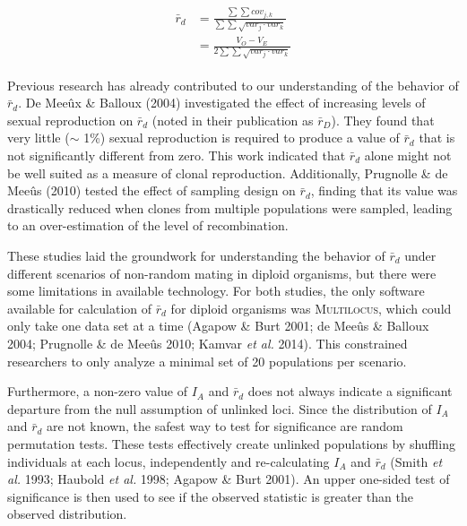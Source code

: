 \documentclass[]{article}
\theoremstyle{definition}
\theoremstyle{definition}
\theoremstyle{remark}
\begin{document}
\begin{align} %
\begin{split} %
\bar{r}_d &= \frac{\sum\sum{cov_{j,k}}}{
                   \sum\sum{\sqrt{var_{j} \cdot var_{k}}}} \\
          &= \frac{V_O - V_E}{2\sum\sum{\sqrt{var_{j} \cdot var_{k}}}}
\end{split}
\label{eq:rd}
\end{align}

Previous research has already contributed to our understanding of the
behavior of \(\bar{r}_d\). De Meeûx \& Balloux (2004) investigated the
effect of increasing levels of sexual reproduction on \(\bar{r}_d\)
(noted in their publication as \(\bar{r}_D\)). They found that very
little (\(\sim\) 1\%) sexual reproduction is required to produce a value
of \(\bar{r}_d\) that is not significantly different from zero. This
work indicated that \(\bar{r}_d\) alone might not be well suited as a
measure of clonal reproduction. Additionally, Prugnolle \& de Meeûs
(2010) tested the effect of sampling design on \(\bar{r}_d\), finding
that its value was drastically reduced when clones from multiple
populations were sampled, leading to an over-estimation of the level of
recombination.

These studies laid the groundwork for understanding the behavior of
\(\bar{r}_d\) under different scenarios of non-random mating in diploid
organisms, but there were some limitations in available technology. For
both studies, the only software available for calculation of
\(\bar{r}_d\) for diploid organisms was \textsc{Multilocus}, which could
only take one data set at a time (Agapow \& Burt 2001; de Meeûs \&
Balloux 2004; Prugnolle \& de Meeûs 2010; Kamvar \emph{et al.} 2014).
This constrained researchers to only analyze a minimal set of 20
populations per scenario.

Furthermore, a non-zero value of \(I_A\) and \(\bar{r}_d\) does not
always indicate a significant departure from the null assumption of
unlinked loci. Since the distribution of \(I_A\) and \(\bar{r}_d\) are
not known, the safest way to test for significance are random
permutation tests. These tests effectively create unlinked populations
by shuffling individuals at each locus, independently and re-calculating
\(I_A\) and \(\bar{r}_d\) (Smith \emph{et al.} 1993; Haubold \emph{et
al.} 1998; Agapow \& Burt 2001). An upper one-sided test of significance
is then used to see if the observed statistic is greater than the
observed distribution.
\end{document}
